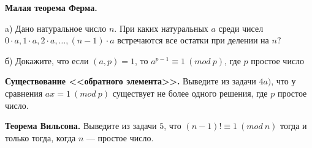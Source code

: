 \textbf{Малая теорема Ферма.}

a) Дано натуральное число $n$. При каких натуральных $a$ среди чисел $0 \cdot a, 1 \cdot a, 2 \cdot a, \ldots,(n-1) \cdot a$ встречаются все остатки при делении на $n ?$

б) Докажите, что если $(a, p) = 1$, то $a^{p-1} \equiv 1 \ (mod \ p)$, где $p$ простое число

\textbf{Существование <<обратного элемента>>.} Выведите из задачи $4a)$, что у сравнения $ax = 1 \ (mod \ p)$ существует не более одного решения, где $p$ простое число.

\textbf{Теорема Вильсона.} Выведите из задачи $5$, что $(n-1)! \equiv 1 \ (mod \ n)$ тогда и только тогда, когда $n$ --- простое число.